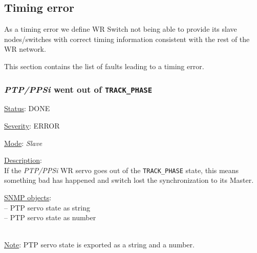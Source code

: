 \subsection{Timing error}
As a timing error we define WR Switch not being able to provide its slave
nodes/switches with correct timing information consistent with the rest of the
WR network.

\noindent This section contains the list of faults leading to a timing error.

\subsubsection{\bf \emph{PTP/PPSi} went out of \texttt{TRACK\_PHASE}}
		\label{fail:timing:ppsi_track_phase}
		\begin{packed_enum}
			\item [] \underline{Status}: DONE
			\item [] \underline{Severity}: ERROR
			\item [] \underline{Mode}: \emph{Slave}
			\item [] \underline{Description}:\\
				If the \emph{PTP/PPSi} WR servo goes out of the \texttt{TRACK\_PHASE}
				state, this means something bad has happened and switch lost the
				synchronization to its Master.
			\item [] \underline{SNMP objects}:\\
				 -- PTP servo state as string\\
				 -- PTP servo state as number\\
				\\
			\item [] \underline{Note}: PTP servo state is exported as a string and a number.
		\end{packed_enum}

